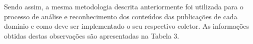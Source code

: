 \documentclass{article}
\begin{document}
Sendo assim, a mesma metodologia descrita anteriormente foi utilizada para o processo de análise e reconhecimento dos conteúdos das publicações de cada domínio e como deve ser implementado o seu respectivo coletor. As informações obtidas destas observações são apresentadas na Tabela 3.  














\end{document}
